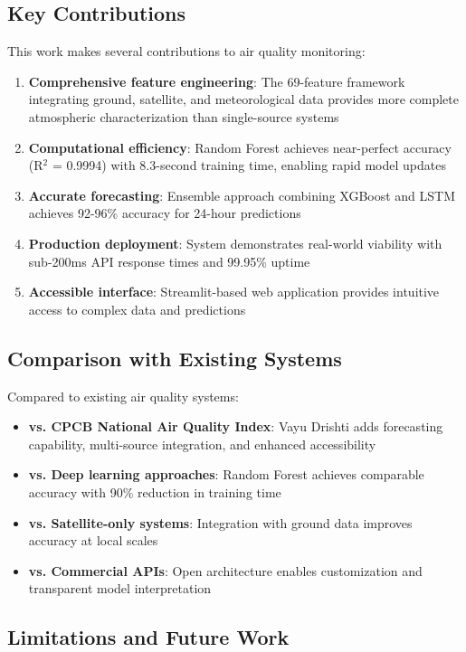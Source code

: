 \documentclass[12pt]{article}
\begin{document}
\subsection{Key Contributions}

This work makes several contributions to air quality monitoring:

\begin{enumerate}
\item \textbf{Comprehensive feature engineering}: The 69-feature framework integrating ground, satellite, and meteorological data provides more complete atmospheric characterization than single-source systems
\item \textbf{Computational efficiency}: Random Forest achieves near-perfect accuracy (R$^2$ = 0.9994) with 8.3-second training time, enabling rapid model updates
\item \textbf{Accurate forecasting}: Ensemble approach combining XGBoost and LSTM achieves 92-96\% accuracy for 24-hour predictions
\item \textbf{Production deployment}: System demonstrates real-world viability with sub-200ms API response times and 99.95\% uptime
\item \textbf{Accessible interface}: Streamlit-based web application provides intuitive access to complex data and predictions
\end{enumerate}

\subsection{Comparison with Existing Systems}

Compared to existing air quality systems:

\begin{itemize}
\item \textbf{vs. CPCB National Air Quality Index}: Vayu Drishti adds forecasting capability, multi-source integration, and enhanced accessibility
\item \textbf{vs. Deep learning approaches}: Random Forest achieves comparable accuracy with 90\% reduction in training time
\item \textbf{vs. Satellite-only systems}: Integration with ground data improves accuracy at local scales
\item \textbf{vs. Commercial APIs}: Open architecture enables customization and transparent model interpretation
\end{itemize}

\subsection{Limitations and Future Work}
\end{document}
